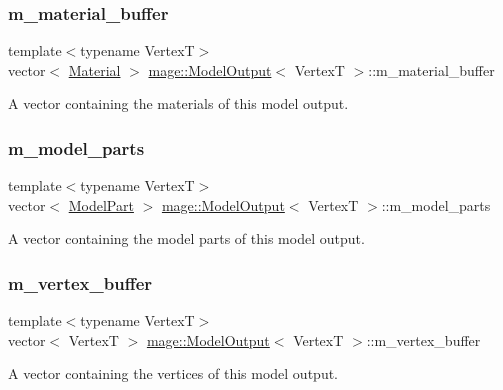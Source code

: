 \subsubsection{\texorpdfstring{m\+\_\+material\+\_\+buffer}{m\_material\_buffer}}
{\footnotesize\ttfamily template$<$typename VertexT$>$ \\
vector$<$ \hyperlink{structmage_1_1_material}{Material} $>$ \hyperlink{structmage_1_1_model_output}{mage\+::\+Model\+Output}$<$ VertexT $>$\+::m\+\_\+material\+\_\+buffer}

A vector containing the materials of this model output. \hypertarget{structmage_1_1_model_output_a86df369ff4959458ee6991c36e6aa01a}{}\label{structmage_1_1_model_output_a86df369ff4959458ee6991c36e6aa01a} 
\subsubsection{\texorpdfstring{m\+\_\+model\+\_\+parts}{m\_model\_parts}}
{\footnotesize\ttfamily template$<$typename VertexT$>$ \\
vector$<$ \hyperlink{structmage_1_1_model_part}{Model\+Part} $>$ \hyperlink{structmage_1_1_model_output}{mage\+::\+Model\+Output}$<$ VertexT $>$\+::m\+\_\+model\+\_\+parts}

A vector containing the model parts of this model output. \hypertarget{structmage_1_1_model_output_a4d669b5fee2d6a1bc993a94b0a2d5580}{}\label{structmage_1_1_model_output_a4d669b5fee2d6a1bc993a94b0a2d5580} 
\subsubsection{\texorpdfstring{m\+\_\+vertex\+\_\+buffer}{m\_vertex\_buffer}}
{\footnotesize\ttfamily template$<$typename VertexT$>$ \\
vector$<$ VertexT $>$ \hyperlink{structmage_1_1_model_output}{mage\+::\+Model\+Output}$<$ VertexT $>$\+::m\+\_\+vertex\+\_\+buffer}

A vector containing the vertices of this model output. 